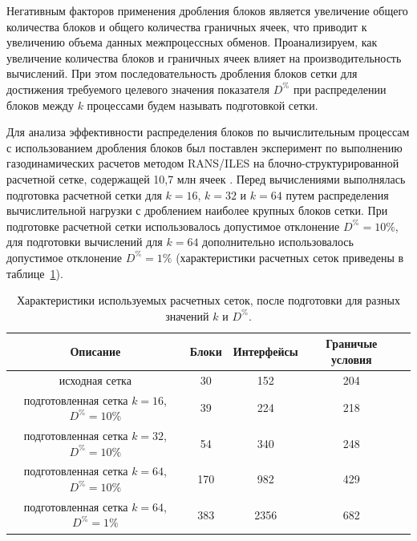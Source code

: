 Негативным факторов применения дробления блоков является увеличение общего количества блоков и общего количества граничных ячеек, что приводит к увеличению объема данных межпроцессных обменов.
Проанализируем, как увеличение количества блоков и граничных ячеек влияет на производительность вычислений.
При этом последовательность дробления блоков сетки для достижения требуемого целевого значения показателя $D^{\%}$ при распределении блоков между $k$ процессами будем называть подготовкой сетки.

Для анализа эффективности распределения блоков по вычислительным процессам с использованием дробления блоков был поставлен эксперимент по выполнению газодинамических расчетов методом RANS/ILES на блочно-структурированной расчетной сетке, содержащей 10,7 млн ячеек \cite{Savin2019RANS}.
Перед вычислениями выполнялась подготовка расчетной сетки для $k = 16$, $k = 32$ и $k = 64$ путем распределения вычислительной нагрузки с дроблением наиболее крупных блоков сетки.
При подготовке расчетной сетки использовалось допустимое отклонение $D^{\%} = 10\%$, для подготовки вычислений для $k = 64$ дополнительно использовалось допустимое отклонение $D^{\%} = 1\%$ (характеристики расчетных сеток приведены в таблице~\ref{tbl:text_2_withcut}).

\begin{table}[!ht]
\centering
\singlespacing
{}\caption{Характеристики используемых расчетных сеток, после подготовки для разных значений $k$ и $D^{\%}$.}
\bigskip
\label{tbl:text_2_withcut}
\begin{tabular}{ | c | c | c | c | c | }
  \hline
  Описание & Блоки & Интерфейсы & Граничые условия \\ \hline\hline
  исходная сетка & 30 & 152 & 204 \\ \hline\hline
  \makecell{подготовленная сетка \\ $k = 16$, $D^{\%} = 10\%$} & 39 & 224 & 218 \\ \hline
  \makecell{подготовленная сетка \\ $k = 32$, $D^{\%} = 10\%$} & 54 & 340 & 248 \\ \hline
  \makecell{подготовленная сетка \\ $k = 64$, $D^{\%} = 10\%$} & 170 & 982 & 429 \\ \hline\hline
  \makecell{подготовленная сетка \\ $k = 64$, $D^{\%} = 1\%$} & 383 & 2356 & 682 \\ \hline
\end{tabular}
\end{table}

